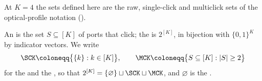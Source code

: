
At $K=4$ the sets defined here are the raw, single-click and multiclick sets
of the optical-profile notation
().

\begin{definition}\label{def:clickalphabet}
An  is the set $S\subseteq[K]$ of ports that click; the
 is $2^{[K]}$, in bijection with $\{0,1\}^{K}$ by indicator
vectors. We write
\begin{equation}\label{eq:mcsc}
  \SCK\coloneqq\big\{\{k\}:k\in[K]\big\},\qquad
  \MCK\coloneqq\big\{S\subseteq[K]:|S|\ge2\big\}
\end{equation}
for the  and the , so that
$2^{[K]}=\{\varnothing\}\sqcup\SCK\sqcup\MCK$, and $\varnothing$ is the
.
\end{definition}
